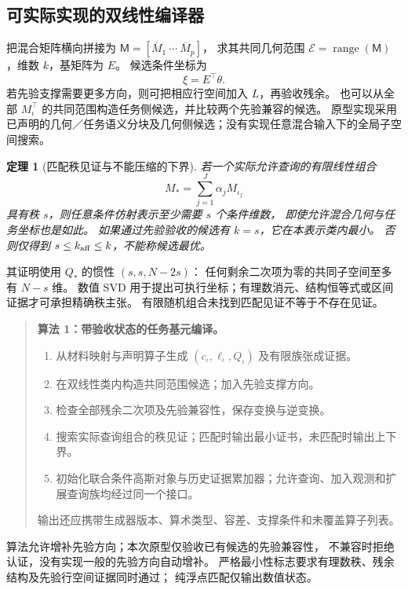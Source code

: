 \documentclass[11pt,a4paper]{article}
\numberwithin{equation}{section}
\newtheorem{theorem}{定理}[section]
\theoremstyle{definition}
\DeclareMathOperator{\range}{range}
\begin{document}
\subsection{可实际实现的双线性编译器}
把混合矩阵横向拼接为 \(\mathsf M=[\overline M_1\ \cdots\ \overline M_p]\)，
求其共同几何范围 \(\mathcal E=\range(\mathsf M)\)，维数 \(k\)，基矩阵为 \(E\)。
候选条件坐标为
\begin{equation}
 \xi=E^\top\theta .
 \label{eq:conditioning}
\end{equation}
若先验支撑需要更多方向，则可把相应行空间加入 \(L\)，再验收残余。
也可以从全部 \(M_\iota^\top\) 的共同范围构造任务侧候选，并比较两个先验兼容的候选。
原型实现采用已声明的几何／任务语义分块及几何侧候选；没有实现任意混合输入下的全局子空间搜索。

\begin{theorem}[匹配秩见证与不能压缩的下界]
\label{thm:minimal}
若一个\emph{实际允许查询}的有限线性组合
\begin{equation}
 M_* =\sum_{j=1}^{J}\alpha_j M_{\iota_j}
 \label{eq:witness}
\end{equation}
具有秩 \(s\)，则任意条件仿射表示至少需要 \(s\) 个条件维数，
即使允许混合几何与任务坐标也是如此。
如果通过先验验收的候选有 \(k=s\)，它在本表示类内最小。
否则仅得到 \(s\le k_{\rm aff}\le k\)，不能称候选最优。
\end{theorem}

其证明使用 \(Q_*\) 的惯性 \((s,s,N-2s)\)：
任何剩余二次项为零的共同子空间至多有 \(N-s\) 维。
数值 SVD 用于提出可执行坐标；有理数消元、结构恒等式或区间证据才可承担精确秩主张。
有限随机组合未找到匹配见证不等于不存在见证。

\begin{quote}
\textbf{算法 1：带验收状态的任务基元编译。}
\begin{enumerate}
\item 从材料映射与声明算子生成 \((c_\iota,\ell_\iota,Q_\iota)\) 及有限族张成证据。
\item 在双线性类内构造共同范围候选；加入先验支撑方向。
\item 检查全部残余二次项及先验兼容性，保存变换与逆变换。
\item 搜索实际查询组合的秩见证；匹配时输出最小证书，未匹配时输出上下界。
\item 初始化联合条件高斯对象与历史证据累加器；允许查询、加入观测和扩展查询族均经过同一个接口。
\end{enumerate}
输出还应携带生成器版本、算术类型、容差、支撑条件和未覆盖算子列表。
\end{quote}
算法允许增补先验方向；本次原型仅验收已有候选的先验兼容性，
不兼容时拒绝认证，没有实现一般的先验方向自动增补。
严格最小性标志要求有理数秩、残余结构及先验行空间证据同时通过；
纯浮点匹配仅输出数值状态。
\end{document}
